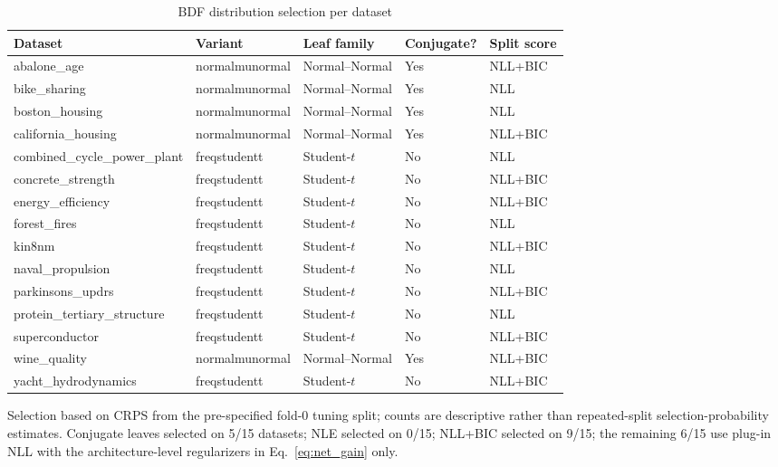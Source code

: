 \begin{table}[htbp]
\centering
\caption{BDF distribution selection per dataset}
\label{tab:bdf-selection}
\begin{tabular}{lllll}
\toprule
Dataset & Variant & Leaf family & Conjugate? & Split score \\
\midrule
abalone\_age & normalmunormal & Normal--Normal & Yes & NLL+BIC \\
bike\_sharing & normalmunormal & Normal--Normal & Yes & NLL \\
boston\_housing & normalmunormal & Normal--Normal & Yes & NLL \\
california\_housing & normalmunormal & Normal--Normal & Yes & NLL+BIC \\
combined\_cycle\_power\_plant & freqstudentt & Student-$t$ & No & NLL \\
concrete\_strength & freqstudentt & Student-$t$ & No & NLL+BIC \\
energy\_efficiency & freqstudentt & Student-$t$ & No & NLL+BIC \\
forest\_fires & freqstudentt & Student-$t$ & No & NLL \\
kin8nm & freqstudentt & Student-$t$ & No & NLL+BIC \\
naval\_propulsion & freqstudentt & Student-$t$ & No & NLL \\
parkinsons\_updrs & freqstudentt & Student-$t$ & No & NLL+BIC \\
protein\_tertiary\_structure & freqstudentt & Student-$t$ & No & NLL \\
superconductor & freqstudentt & Student-$t$ & No & NLL+BIC \\
wine\_quality & normalmunormal & Normal--Normal & Yes & NLL+BIC \\
yacht\_hydrodynamics & freqstudentt & Student-$t$ & No & NLL+BIC \\
\bottomrule
\end{tabular}
\par\smallskip\footnotesize{Selection based on CRPS from the pre-specified fold-0 tuning split; counts are descriptive rather than repeated-split selection-probability estimates. Conjugate leaves selected on 5/15 datasets; NLE selected on 0/15; NLL+BIC selected on 9/15; the remaining 6/15 use plug-in NLL with the architecture-level regularizers in Eq.~\eqref{eq:net_gain} only.}
\end{table}
